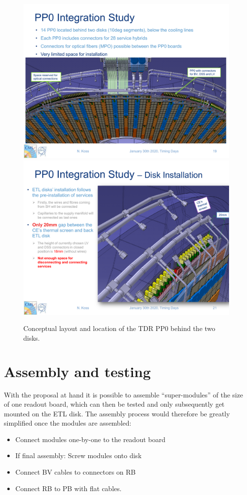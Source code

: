 \documentclass[11pt]{article}
\begin{document}
\begin{figure}[!p]
\centering
\includegraphics[width=.9 \textwidth]{figures/PP0_3D.pdf}\\
\includegraphics[width=.9 \textwidth]{figures/PP0_location.pdf}
\caption{
Conceptual layout and location of the TDR PP0 behind the two disks.
}
\label{fig:PP0_3D}
\end{figure}

\section{Assembly and testing}

With the proposal at hand it is possible to assemble ``super-modules'' of the size of one readout board, which can then be tested and only subsequently get mounted on the ETL disk.
The assembly process would therefore be greatly simplified once the modules are assembled:
\begin{itemize}
  \item Connect modules one-by-one to the readout board
  \item If final assembly: Screw modules onto disk
  \item Connect BV cables to connectors on RB
  \item Connect RB to PB with flat cables.
\end{itemize}
\end{document}
